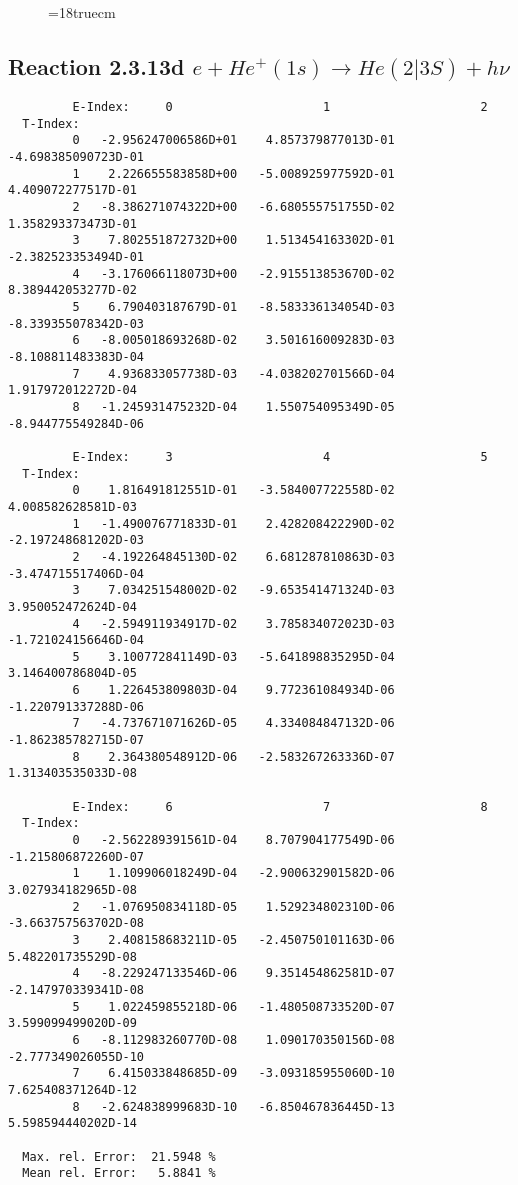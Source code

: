 \begin{figure} \label{2.3.13c}
\epsfxsize=18truecm
\end{figure}
\newpage

\subsection{
Reaction 2.3.13d  $e + He^+(1s) \rightarrow He(2|3S) + h\nu $
}


\begin{verbatim}
         E-Index:     0                     1                     2
  T-Index:
         0   -2.956247006586D+01    4.857379877013D-01   -4.698385090723D-01
         1    2.226655583858D+00   -5.008925977592D-01    4.409072277517D-01
         2   -8.386271074322D+00   -6.680555751755D-02    1.358293373473D-01
         3    7.802551872732D+00    1.513454163302D-01   -2.382523353494D-01
         4   -3.176066118073D+00   -2.915513853670D-02    8.389442053277D-02
         5    6.790403187679D-01   -8.583336134054D-03   -8.339355078342D-03
         6   -8.005018693268D-02    3.501616009283D-03   -8.108811483383D-04
         7    4.936833057738D-03   -4.038202701566D-04    1.917972012272D-04
         8   -1.245931475232D-04    1.550754095349D-05   -8.944775549284D-06

         E-Index:     3                     4                     5
  T-Index:
         0    1.816491812551D-01   -3.584007722558D-02    4.008582628581D-03
         1   -1.490076771833D-01    2.428208422290D-02   -2.197248681202D-03
         2   -4.192264845130D-02    6.681287810863D-03   -3.474715517406D-04
         3    7.034251548002D-02   -9.653541471324D-03    3.950052472624D-04
         4   -2.594911934917D-02    3.785834072023D-03   -1.721024156646D-04
         5    3.100772841149D-03   -5.641898835295D-04    3.146400786804D-05
         6    1.226453809803D-04    9.772361084934D-06   -1.220791337288D-06
         7   -4.737671071626D-05    4.334084847132D-06   -1.862385782715D-07
         8    2.364380548912D-06   -2.583267263336D-07    1.313403535033D-08

         E-Index:     6                     7                     8
  T-Index:
         0   -2.562289391561D-04    8.707904177549D-06   -1.215806872260D-07
         1    1.109906018249D-04   -2.900632901582D-06    3.027934182965D-08
         2   -1.076950834118D-05    1.529234802310D-06   -3.663757563702D-08
         3    2.408158683211D-05   -2.450750101163D-06    5.482201735529D-08
         4   -8.229247133546D-06    9.351454862581D-07   -2.147970339341D-08
         5    1.022459855218D-06   -1.480508733520D-07    3.599099499020D-09
         6   -8.112983260770D-08    1.090170350156D-08   -2.777349026055D-10
         7    6.415033848685D-09   -3.093185955060D-10    7.625408371264D-12
         8   -2.624838999683D-10   -6.850467836445D-13    5.598594440202D-14

  Max. rel. Error:  21.5948 %
  Mean rel. Error:   5.8841 %

\end{verbatim}
